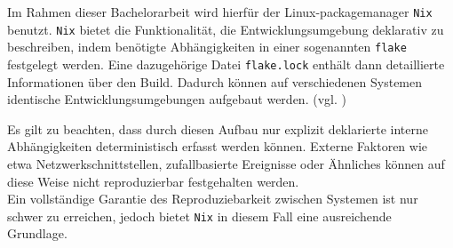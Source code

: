 Im Rahmen dieser Bachelorarbeit wird hierfür der Linux-packagemanager \texttt{Nix} benutzt. \texttt{Nix} bietet die Funktionalität, die Entwicklungsumgebung deklarativ zu beschreiben, indem benötigte Abhängigkeiten in einer sogenannten \texttt{flake} festgelegt werden. Eine dazugehörige Datei \texttt{flake.lock} enthält dann detaillierte Informationen über den Build. Dadurch können auf verschiedenen Systemen identische Entwicklungsumgebungen aufgebaut werden. (vgl. \textcite[2f.]{malkaNix})

Es gilt zu beachten, dass durch diesen Aufbau nur explizit deklarierte interne Abhängigkeiten deterministisch erfasst werden können. Externe Faktoren wie etwa Netzwerkschnittstellen, zufallbasierte Ereignisse oder Ähnliches können auf diese Weise nicht reproduzierbar festgehalten werden.\\
Ein vollständige Garantie des Reproduziebarkeit zwischen Systemen ist nur schwer zu erreichen, jedoch bietet \texttt{Nix} in diesem Fall eine ausreichende Grundlage. 

